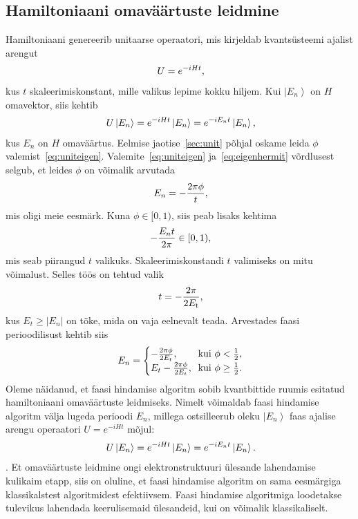 \documentclass[12pt]{report}
\def\abs#1{\left|#1\right|}
\def\ket#1{\left|#1\right>}
\begin{document}
\subsection{Hamiltoniaani omaväärtuste leidmine}\label{sec:ham}

Hamiltoniaani genereerib unitaarse operaatori, mis kirjeldab kvantsüsteemi ajalist arengut
\begin{align}
    U = e^{-iHt} \rlap{,}
\end{align}
kus \(t\) skaleerimiskonstant, mille valikus lepime kokku hiljem.
Kui \(\ket{E_n}\) on \(H\) omavektor, siis kehtib
\begin{align}\label{eq:eigenhermit}
    U \ket{E_n} = e^{-iHt}\ket{E_n} = e^{-i E_n t} \ket{E_n} \rlap{,}
\end{align}
kus \(E_n\) on \(H\) omaväärtus.
Eelmise jaotise~\ref{sec:unit} põhjal oskame leida \(\phi\) valemist~\eqref{eq:uniteigen}.
Valemite~\eqref{eq:uniteigen} ja~\eqref{eq:eigenhermit} võrdlusest selgub, et leides \(\phi\) on võimalik arvutada
\begin{align}
    E_n = -\frac{2\pi\phi}{t} \rlap{,}
\end{align}
mis oligi meie eesmärk.
Kuna \(\phi \in [0, 1)\), siis peab lisaks kehtima
\begin{align}
    -\frac{E_n t}{2\pi} \in [0, 1) \rlap{,}
\end{align}
mis seab piirangud \(t\) valikuks.
Skaleerimiskonstandi \(t\) valimiseks on mitu võimalust.
Selles töös on tehtud valik
\begin{align}
    t = -\frac{2\pi}{2E_\mathrm{t}} \rlap{,}
\end{align}
kus \(E_t \ge \abs{E_n}\) on tõke, mida on vaja eelnevalt teada.
Arvestades faasi perioodilisust kehtib siis
\begin{align}
    E_n = \begin{cases}
        -\frac{2\pi\phi}{2E_t}\rlap{,} & \text{kui } \phi < \frac{1}{2} \rlap{,} \\
        E_t - \frac{2\pi\phi}{2E_t}\rlap{,} & \text{kui } \phi \ge \frac{1}{2} \rlap{.} \\
    \end{cases}
\end{align}
Oleme näidanud, et faasi hindamise algoritm sobib kvantbittide ruumis esitatud hamiltoniaani omaväärtuste leidmiseks.
Nimelt võimaldab faasi hindamise algoritm välja lugeda perioodi \(E_n\), millega ostsilleerub oleku \(\ket{E_n}\) faas ajalise arengu operaatori \(U = e^{-iHt}\) mõjul:
\begin{align}
    U \ket{E_n} = e^{-iHt} \ket{E_n} = e^{-iE_n t} \ket{E_n} \rlap{.}
\end{align}
.
Et omaväärtuste leidmine ongi elektronstruktuuri ülesande lahendamise kulikaim etapp, siis on oluline, et faasi hindamise algoritm on sama eesmärgiga klassikalstest algoritmidest efektiivsem.
Faasi hindamise algoritmiga loodetakse tulevikus lahendada keerulisemaid ülesandeid, kui on võimalik klassikaliselt.
\end{document}
